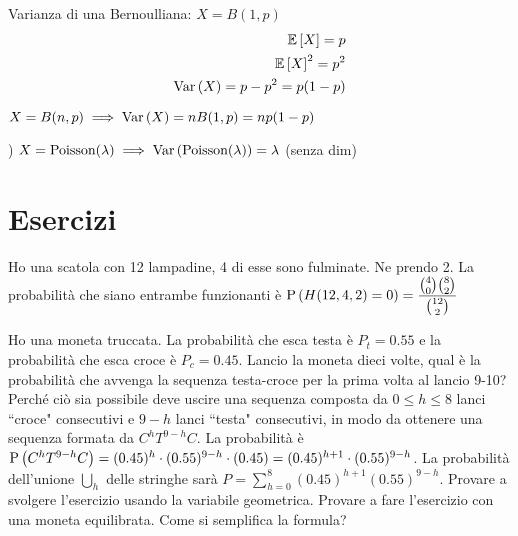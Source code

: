 \begin{exmp}
	Varianza di una Bernoulliana: $ X = B(1,p) $
	\begin{equation*}
	\begin{aligned}
		\mathbb{E}\left[X\right] = p \\
		\mathbb{E}\left[X\right]^2 = p^2 \\
		\text{Var}\left(X\right) = p-p^2 = p(1-p)
	\end{aligned}
	\end{equation*}
\end{exmp}

\begin{exmp}
	$ X = B(n,p) \implies \text{Var}\left(X\right) = nB(1,p) = np(1-p) $
\end{exmp}

\begin{exmp})
	$ X = \text{Poisson}(\lambda)  \implies  \text{Var}\left(\text{Poisson}(\lambda)\right) = \lambda $
	(senza dim)
\end{exmp}





\section{Esercizi}

\begin{exrc}
    Ho una scatola con 12 lampadine, 4 di esse sono fulminate. Ne prendo 2. La probabilit\`a  che siano entrambe funzionanti \`e $ \text{P}\left(H(12, 4, 2) = 0\right) = \dfrac{\binom{4}{0}\binom{8}{2}}{\binom{12}{2}} $
\end{exrc}
\begin{exrc}
    Ho una moneta truccata. La probabilit\`a  che esca testa \`e $ P_t = 0.55 $ e la probabilit\`a  che esca croce \`e $ P_c = 0.45 $. Lancio la moneta dieci volte, qual \`e la probabilit\`a  che avvenga la sequenza testa-croce per la prima volta al lancio 9-10? Perch\'e ci\`o  sia possibile deve uscire una sequenza composta da $ 0 \leq h \leq 8 $ lanci ``croce" consecutivi e $ 9-h $ lanci  ``testa" consecutivi, in modo da ottenere una sequenza formata da $ C^hT^{9-h}C $. La probabilit\`a  \`e $ \text{P}\left(C^hT^{9-h}C\right) = (0.45)^h \cdot (0.55)^{9-h} \cdot (0.45) = (0.45)^{h+1} \cdot (0.55)^{9-h}$. La probabilit\`a  dell'unione $ \bigcup_{h} $ delle stringhe sar\`a  $ P = \sum_{h=0}^8(0.45)^{h+1}(0.55)^{9-h}$. Provare a svolgere l'esercizio usando la  variabile geometrica. Provare a fare l'esercizio con una moneta equilibrata. Come si semplifica la formula?


\end{exrc}

